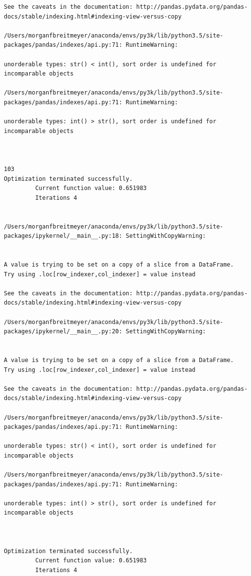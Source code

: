 \begin{lstlisting}
See the caveats in the documentation: http://pandas.pydata.org/pandas-docs/stable/indexing.html#indexing-view-versus-copy

/Users/morganfbreitmeyer/anaconda/envs/py3k/lib/python3.5/site-packages/pandas/indexes/api.py:71: RuntimeWarning:

unorderable types: str() < int(), sort order is undefined for incomparable objects

/Users/morganfbreitmeyer/anaconda/envs/py3k/lib/python3.5/site-packages/pandas/indexes/api.py:71: RuntimeWarning:

unorderable types: int() > str(), sort order is undefined for incomparable objects



103
Optimization terminated successfully.
         Current function value: 0.651983
         Iterations 4


/Users/morganfbreitmeyer/anaconda/envs/py3k/lib/python3.5/site-packages/ipykernel/__main__.py:18: SettingWithCopyWarning:


A value is trying to be set on a copy of a slice from a DataFrame.
Try using .loc[row_indexer,col_indexer] = value instead

See the caveats in the documentation: http://pandas.pydata.org/pandas-docs/stable/indexing.html#indexing-view-versus-copy

/Users/morganfbreitmeyer/anaconda/envs/py3k/lib/python3.5/site-packages/ipykernel/__main__.py:20: SettingWithCopyWarning:


A value is trying to be set on a copy of a slice from a DataFrame.
Try using .loc[row_indexer,col_indexer] = value instead

See the caveats in the documentation: http://pandas.pydata.org/pandas-docs/stable/indexing.html#indexing-view-versus-copy

/Users/morganfbreitmeyer/anaconda/envs/py3k/lib/python3.5/site-packages/pandas/indexes/api.py:71: RuntimeWarning:

unorderable types: str() < int(), sort order is undefined for incomparable objects

/Users/morganfbreitmeyer/anaconda/envs/py3k/lib/python3.5/site-packages/pandas/indexes/api.py:71: RuntimeWarning:

unorderable types: int() > str(), sort order is undefined for incomparable objects



Optimization terminated successfully.
         Current function value: 0.651983
         Iterations 4



\end{lstlisting}
